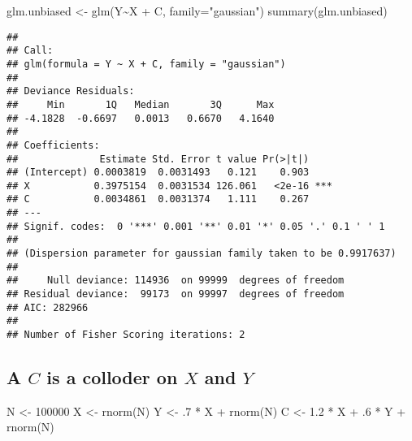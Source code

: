 \documentclass[
]{book}
\newenvironment{Shaded}{\begin{snugshade}}{\end{snugshade}}
\newcommand{\AttributeTok}[1]{\textcolor[rgb]{0.77,0.63,0.00}{#1}}
\newcommand{\DecValTok}[1]{\textcolor[rgb]{0.00,0.00,0.81}{#1}}
\newcommand{\FloatTok}[1]{\textcolor[rgb]{0.00,0.00,0.81}{#1}}
\newcommand{\FunctionTok}[1]{\textcolor[rgb]{0.00,0.00,0.00}{#1}}
\newcommand{\NormalTok}[1]{#1}
\newcommand{\OtherTok}[1]{\textcolor[rgb]{0.56,0.35,0.01}{#1}}
\newcommand{\SpecialCharTok}[1]{\textcolor[rgb]{0.00,0.00,0.00}{#1}}
\newcommand{\StringTok}[1]{\textcolor[rgb]{0.31,0.60,0.02}{#1}}
\begin{document}
\begin{Shaded}
\begin{Highlighting}[]
\NormalTok{glm.unbiased }\OtherTok{\textless{}{-}} \FunctionTok{glm}\NormalTok{(Y}\SpecialCharTok{\textasciitilde{}}\NormalTok{X }\SpecialCharTok{+}\NormalTok{ C, }\AttributeTok{family=}\StringTok{"gaussian"}\NormalTok{)}
\FunctionTok{summary}\NormalTok{(glm.unbiased)}
\end{Highlighting}
\end{Shaded}

\begin{verbatim}
## 
## Call:
## glm(formula = Y ~ X + C, family = "gaussian")
## 
## Deviance Residuals: 
##     Min       1Q   Median       3Q      Max  
## -4.1828  -0.6697   0.0013   0.6670   4.1640  
## 
## Coefficients:
##              Estimate Std. Error t value Pr(>|t|)    
## (Intercept) 0.0003819  0.0031493   0.121    0.903    
## X           0.3975154  0.0031534 126.061   <2e-16 ***
## C           0.0034861  0.0031374   1.111    0.267    
## ---
## Signif. codes:  0 '***' 0.001 '**' 0.01 '*' 0.05 '.' 0.1 ' ' 1
## 
## (Dispersion parameter for gaussian family taken to be 0.9917637)
## 
##     Null deviance: 114936  on 99999  degrees of freedom
## Residual deviance:  99173  on 99997  degrees of freedom
## AIC: 282966
## 
## Number of Fisher Scoring iterations: 2
\end{verbatim}

\hypertarget{a-c-is-a-colloder-on-x-and-y}{%
\subsection{\texorpdfstring{A \(C\) is a colloder on \(X\) and \(Y\)}{A C is a colloder on X and Y}}\label{a-c-is-a-colloder-on-x-and-y}}

\begin{Shaded}
\begin{Highlighting}[]
\NormalTok{N }\OtherTok{\textless{}{-}} \DecValTok{100000}
\NormalTok{X }\OtherTok{\textless{}{-}} \FunctionTok{rnorm}\NormalTok{(N)}
\NormalTok{Y }\OtherTok{\textless{}{-}}\NormalTok{ .}\DecValTok{7} \SpecialCharTok{*}\NormalTok{ X }\SpecialCharTok{+} \FunctionTok{rnorm}\NormalTok{(N)}
\NormalTok{C }\OtherTok{\textless{}{-}} \FloatTok{1.2} \SpecialCharTok{*}\NormalTok{ X }\SpecialCharTok{+}\NormalTok{ .}\DecValTok{6} \SpecialCharTok{*}\NormalTok{ Y }\SpecialCharTok{+} \FunctionTok{rnorm}\NormalTok{(N)}
\end{Highlighting}
\end{Shaded}
\end{document}
